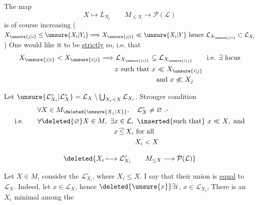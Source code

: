  The map
\[
 X\longmapsto L_{X_i}\qquad
 M_{\leq X}\longrightarrow\mathcal P(\mathcal{L})
\]
is of course increasing ($X_{\unsure{j|i}}\leq \unsure{X_i|Y_i}\Longrightarrow X_{\unsure{j|i}}\ll \unsure{X_i|Y}\text{ hence }\mathcal{L}_{X_{\unsure{j|i}}}\subset \mathcal{L}_{X_i}$) One would like it to be \uline{strictly} so, i.e. that 
\[
\begin{aligned}
 X_{\unsure{j|i}}<X_{\unsure{i|j}}&\Longrightarrow \mathcal{L}_{X_{\unsure{j|i}}}\subsetneq \mathcal{L}_{X_{\unsure{i|j}}}\qquad\text{i.e. }\exists\ \text{locus}\\
 &\qquad x\ \text{such that }x\ll X_{\unsure{i|j}}\\
 &\hspace{8em}\text{and }x\not\ll X_j
\end{aligned}
\]

 Let $\unsure{\mathcal{L}_{X_i}^{\circ}|\mathcal{L}_X^{\circ}}=\mathcal{L}_X\setminus\bigcup_{X_i<X}\mathcal{L}_{X_i}$. Stronger condition
\[
\begin{aligned}
 &\forall X\in M_{\deleted{\unsure{X_j|X}}},\quad \mathcal{L}_X^{\circ}\ne\varnothing\ \text{.-}\\
 \text{i.e.}\qquad &\forall\deleted{\varnothing}X\in M,\ \exists x\in \mathcal{L},\ \inserted{\text{such that}}\ x\ll X,\ \text{and}\\
 &\hspace{11em}x\,\overline{\leq}\,X_i\ \text{for all}\\
 &\hspace{14em}X_i<X
\end{aligned}
\]

\[
 \deleted{X_i\longmapsto \mathcal{L}_{X_i}^{\circ}\qquad M_{\leq X}\longrightarrow\mathcal P(\mathcal{L})}
\]

Let $X\in M$, consider the $\mathcal{L}_{X_i}^{\circ}$, where $X_i\leq X$. I say that their union  is \uline{equal} to $\mathcal{L}_X$. Indeed, let $x\in \mathcal{L}_X$, hence $\deleted{\unsure{x}}\exists i$, $x\in \mathcal{L}_{X_i}$,  There is an $X_i$ minimal among the
